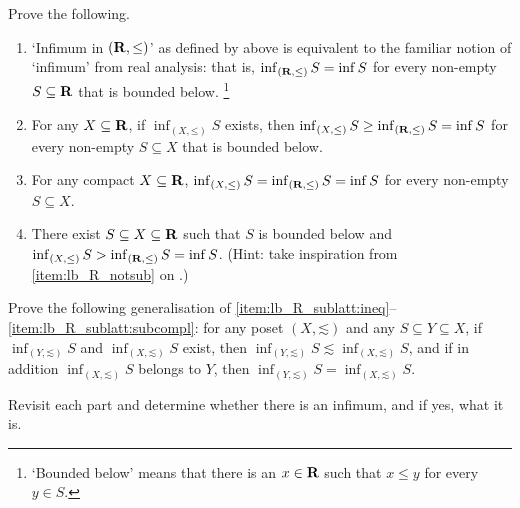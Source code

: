 \begin{exercise}
	\label{exercise:lb-R_sublatt}
	Prove the following.

	\begin{enumerate}[label=(\alph*)]

		\item `Infimum in $(\mathbf{R},\mathord{\leq})$' as defined by  above is equivalent to the familiar notion of `infimum' from real analysis: that is, $\inf_{(\mathbf{R},\mathord{\leq})} S = \inf S$ for every non-empty $S \subseteq \mathbf{R}$ that is bounded below.%
			\footnote{`Bounded below' means that there is an $x \in \mathbf{R}$ such that $x \leq y$ for every $y \in S$.}

		\item \label{item:lb_R_sublatt:ineq} For any $X \subseteq \mathbf{R}$, if $\inf_{(X,\mathord{\leq})} S$ exists, then
		$\inf_{(X,\mathord{\leq})} S 
		\geq \inf_{(\mathbf{R},\mathord{\leq})} S
		= \inf S$ for every non-empty $S \subseteq X$ that is bounded below.

		\item \label{item:lb_R_sublatt:subcompl} For any compact $X \subseteq \mathbf{R}$,
		$\inf_{(X,\mathord{\leq})} S 
		= \inf_{(\mathbf{R},\mathord{\leq})} S
		= \inf S$ for every non-empty $S \subseteq X$.

		\item There exist $S \subseteq X \subseteq \mathbf{R}$ such that $S$ is bounded below and
		$\inf_{(X,\mathord{\leq})} S 
		> \inf_{(\mathbf{R},\mathord{\leq})} S
		= \inf S$.
		(Hint: take inspiration from \ref{item:lb_R_notsub} on .)
	
	\end{enumerate}
\end{exercise}

\begin{exercise}
	\label{exercise:lb_sublat}
	Prove the following generalisation of \ref{item:lb_R_sublatt:ineq}--\ref{item:lb_R_sublatt:subcompl}: for any poset $(X,\mathord{\lesssim})$ and any $S \subseteq Y \subseteq X$, if $\inf_{(Y,\mathord{\lesssim})} S$ and $\inf_{(X,\mathord{\lesssim})} S$ exist, then $\inf_{(Y,\mathord{\lesssim})} S \lesssim \inf_{(X,\mathord{\lesssim})} S$, and if in addition $\inf_{(X,\mathord{\lesssim})} S$ belongs to $Y$, then $\inf_{(Y,\mathord{\lesssim})} S = \inf_{(X,\mathord{\lesssim})} S$.
\end{exercise}

\begin{namedthm}
	\label{exercise:lb-R2_latt}
	Revisit each part and determine whether there is an infimum, and if yes, what it is.
\end{namedthm}

